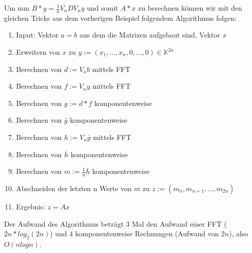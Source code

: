 \documentclass[]{article}
\begin{document}
Um nun $B*y=\frac{1}{n}\overline{V_n}DV_ny$ und somit $A*x$ zu berechnen können wir mit den gleichen Tricks aus dem vorherigen Beispiel folgendem Algorithmus folgen:

\begin{enumerate}
	\item[] Input: Vektor $a=b$ aus dem die Matrizen aufgebaut sind, Vektor $x$
	\item Erweitern von $x$ zu $y:=(x_1, ..., x_n, 0, ..., 0) \in \mathbb{K}^{2n}$
	\item Berechnen von $d:=V_nb$ mittels FFT
	\item Berechnen von $f:=V_ny$ mittels FFT
	\item Berechnen von $g:=d*f$ komponentenweise
	\item Berechnen von $\bar{g}$ komponentenweise
	\item Berechnen von $h:= V_n\bar{g}$ mittels FFT
	\item Berechnen von $\bar{h}$ komponentenweise
	\item Berechnen von $m:= \frac{1}{n} \bar{h}$ komponentenweise
	\item Abschneiden der letzten n Werte von $m$ zu $z:=(m_n, m_{n+1}, ..., m_{2n})$
	\item[] Ergebnis: $z=Ax$ 
\end{enumerate}

Der Aufwand des Algorithmus beträgt 3 Mal den Aufwand einer FFT ($2n * log_2 (2n)$) und 4 komponentenweise Rechnungen (Aufwand von $2n$), also $O(n log n)$.
\end{document}
